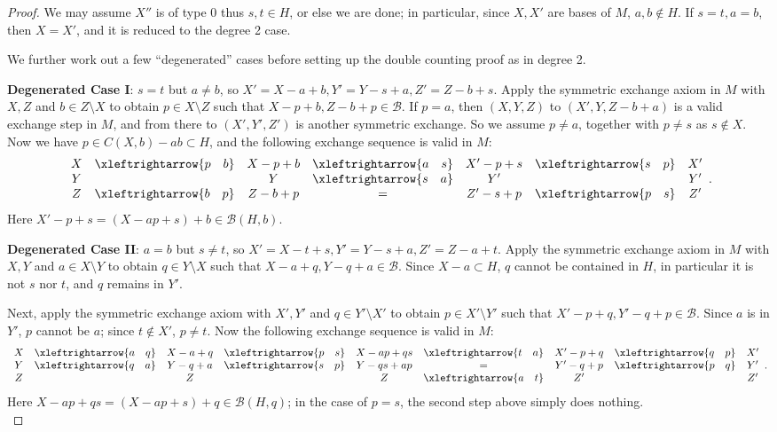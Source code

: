 \documentclass{amsart}
\newcommand{\swap}[2]{\xleftrightarrow{#1 \quad #2}}
\newcommand\Bcal{{\mathcal B}}
\begin{document}
\begin{proof}
    We may assume $X''$ is of type 0 thus $s,t\in H$, or else we are done; in particular, since $X,X'$ are bases of $M$, $a,b\not\in H$. If $s=t,a=b$, then $X=X'$, and it is reduced to the degree 2 case.
    
    We further work out a few ``degenerated'' cases before setting up the double counting proof as in degree 2. 
    
    {\bf Degenerated Case I}: $s=t$ but $a\neq b$, so $X'=X-a+b,Y'=Y-s+a,Z'=Z-b+s$. Apply the symmetric exchange axiom in $M$ with $X,Z$ and $b\in Z\setminus X$ to obtain $p\in X\setminus Z$ such that $X-p+b, Z-b+p\in\Bcal$. If $p=a$, then $(X,Y,Z)$ to $(X',Y,Z-b+a)$ is a valid exchange step in $M$, and from there to $(X',Y',Z')$ is another symmetric exchange. So we assume $p\neq a$, together with $p\neq s$ as $s\not\in X$. Now we have $p\in C(X,b)-ab\subset H$, and the following exchange sequence is valid in $M$:
    $$
    \begin{array}{c c c c c c c}
        X   & \swap{p}{b} & X-p+b & \swap{a}{s} & X'-p+s & \swap{s}{p} & X'\\
        Y   &             & Y    & \swap{s}{a} & Y'      &              & Y'\\
        Z   & \swap{b}{p} & Z-b+p &  =         & Z'-s+p & \swap{p}{s} & Z'
    \end{array}.
    $$
    Here $X'-p+s=(X-ap+s)+b\in\Bcal(H,b)$.

    {\bf Degenerated Case II}: $a=b$ but $s\neq t$, so $X'=X-t+s,Y'=Y-s+a,Z'=Z-a+t$. Apply the symmetric exchange axiom in $M$ with $X,Y$ and $a\in X\setminus Y$ to obtain $q\in Y\setminus X$ such that $X-a+q, Y-q+a\in\Bcal$. Since $X-a\subset H$, $q$ cannot be contained in $H$, in particular it is not $s$ nor $t$, and $q$ remains in $Y'$.

    Next, apply the symmetric exchange axiom with $X',Y'$ and $q\in Y'\setminus X'$ to obtain $p\in X'\setminus Y'$ such that $X'-p+q,Y'-q+p\in\Bcal$. Since $a$ is in $Y'$, $p$ cannot be $a$; since $t\not\in X'$, $p\neq t$. Now the following exchange sequence is valid in $M$:
$$
        \begin{array}{c c c c c c c c c}
           X   & \swap{a}{q} & X - a + q 
                      & \swap{p}{s} & X-ap+qs 
                      & \swap{t}{a} & X'-p+q
                      & \swap{q}{p} & X' \\
           Y & \swap{q}{a} & Y - q + a
                      & \swap{s}{p} & Y-qs+ap
                      &  =          & Y'-q+p
                      & \swap{p}{q} & Y' \\
           Z &             & Z
                      &             & Z
                      & \swap{a}{t} & Z'
                      &             & Z'
        \end{array}.
$$
Here $X-ap+qs=(X-ap+s)+q\in\Bcal(H,q)$; in the case of $p=s$, the second step above simply does nothing.\\


\end{proof}
\end{document}

